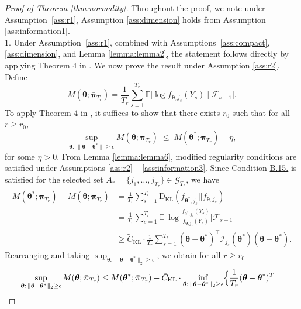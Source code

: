 \documentclass[12pt]{article}
\newcommand{\bfpi}{\boldsymbol{\pi}}
\newcommand{\bftheta}{\boldsymbol{\theta}}
\begin{document}
\begin{proof}[Proof of Theorem \ref{thm:normality}]
Throughout the proof, we note under Assumption~\ref{ass:r1}, Assumption \ref{ass:dimension} holds from Assumption \ref{ass:information1}.
\\ 1. Under Assumption~\ref{ass:r1}, combined with Assumptions~\ref{ass:compact}, 
\ref{ass:dimension}, and Lemma \ref{lemma:lemma2}, the statement follows directly 
by applying Theorem 4 in . We now prove the result under 
Assumption \ref{ass:r2}. Define
\begin{equation*}
M(\bftheta; \bar{\bfpi}_{T_r})
= \frac{1}{T_r} \sum_{s=1}^{T_r} 
  \mathbb{E}\bigl[ \log f_{\bftheta,j_s}(Y_{s}) \mid \mathcal{F}_{s-1} \bigr].
\end{equation*}
To apply Theorem 4 in , it suffices to show that there exists $r_0$ such that for all 
$r \ge r_0$,
\begin{equation*}
\sup_{\bftheta:\,\|\bftheta - \bftheta^{\ast}\| \ge \epsilon}
M(\bftheta; \bar{\bfpi}_{T_r})
\;\le\;
M(\bftheta^{\ast}; \bar{\bfpi}_{T_r}) - \eta,
\end{equation*}
for some $\eta>0$. From Lemma \ref{lemma:lemma6}, modified regularity conditions are satisfied under Assumptions \ref{ass:r2} -- \ref{ass:information3}. Since Condition \hyperref[c:c7b']{B.15.} is satisfied for the selected set $A_r=\{j_1,\ldots,j_{T_r}\}\in\mathcal{G}_{T_r}$, we have
\begin{align*}
M(\bftheta^{\ast}; \bar{\bfpi}_{T_r}) 
- M(\bftheta; \bar{\bfpi}_{T_r})
&= \frac{1}{T_r} \sum_{s = 1}^{T_r} \mathrm{D}_{\mathrm{KL}}( f_{\bftheta^{\ast}, j_s} || f_{\bftheta, j_s}) 
\\ &= \frac{1}{T_r} \sum_{s=1}^{T_r} \mathbb{E} \Big[ \log \frac{f_{\bftheta^{\ast},j_s}(Y_s)}{f_{\bftheta,j_s}(Y_s)} \Big| \mathcal{F}_{s-1} \Big]
\\ & \ge \tilde{C}_{\mathrm{KL}} \cdot 
\frac{1}{T_r} \sum_{s = 1}^{T_r} 
(\bftheta - \bftheta^{\ast})^\top 
\mathcal{I}_{j_s}(\bftheta^{\ast})
(\bftheta - \bftheta^{\ast}).
\end{align*}
Rearranging and taking $\sup_{\bftheta:\,\|\bftheta - \bftheta^{\ast}\|_2 \ge \epsilon}$, 
we obtain for all $r \geq r_0$
\begin{align*}
\sup_{\bftheta:\,\|\bftheta - \bftheta^{\ast}\|_2 \ge \epsilon}
M(\bftheta; \bar{\bfpi}_{T_r})
&\le
M(\bftheta^{\ast}; \bar{\bfpi}_{T_r})
- \tilde{C}_{\mathrm{KL}} \cdot 
\inf_{\bftheta:\,\|\bftheta - \bftheta^{\ast}\|_2 \ge \epsilon}
\Bigl\{
\frac{1}{T_r} (\bftheta - \bftheta^{\ast})^T

\end{align*}
\end{proof}
\end{document}

